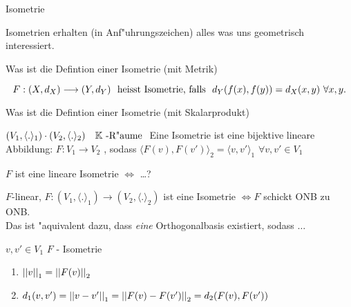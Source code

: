 \documentclass[class=article, crop=false]{standalone}
\begin{document}
\begin{zettel}{Isometrie}

    Isometrien erhalten (in Anf"uhrungszeichen) alles was uns geometrisch interessiert.
\begin{flashcard}
    \begin{question}
    Was ist die Defintion einer Isometrie (mit Metrik)
    \end{question}
    \begin{definition}
        \[
            F: (X,d_X) \longrightarrow (Y, d_Y)   \tx{ heisst Isometrie, falls } d_Y(f(x), f(y)) = d_X (x,y) \forall x,y
        .\]
    \end{definition}
\end{flashcard}

\begin{flashcard}
    \begin{question}
    Was ist die Defintion einer Isometrie (mit Skalarprodukt)
    \end{question}
    \begin{definition}
        $(V_1, \langle .\rangle_1 ) \cdot  (V_2, \langle .\rangle_2) \quad \mathbb{K}\text{ -R"aume }$  
        Eine Isometrie ist eine bijektive lineare Abbildung: $F: V_1 \to V_2$ , sodass $ \langle F(v),F(v')\rangle_2 = \langle v,v'\rangle_1$ $\forall v,v' \in  V_1$ 
    \end{definition}
\end{flashcard}

\begin{flashcard}
\begin{question}
$F$ ist eine lineare Isometrie $\iff$ \dots ?
\end{question}
\begin{lemma}
$F$-linear, $F: (V_1, \langle .\rangle_1) \to (V_2, \langle .\rangle_2)$ ist eine Isometrie $\iff F$ schickt ONB zu ONB.\\
Das ist "aquivalent dazu, dass \emph{eine} Orthogonalbasis existiert, sodass $\dots$ 
\end{lemma}
\end{flashcard}


\begin{remark}
$v,v' \in  V_1$ $F$ - Isometrie
\begin{enumerate}
    \item $ \left|\left|v\right|\right|_1 = \left|\left|F(v)\right|\right|_2$ 
    \item $d_1 (v,v') = \left|\left|v-v'\right|\right|_1 = \left|\left|F(v)-F(v')\right|\right|_2 = d_2 (F(v),F(v'))$ 
\end{enumerate}
\end{remark}


\end{zettel}
\end{document}
